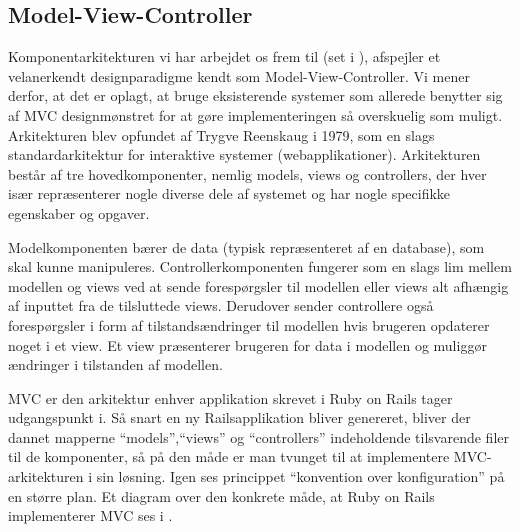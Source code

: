 \subsection{Model-View-Controller}
\label{subsec:mvc}
Komponentarkitekturen vi har arbejdet os frem til (set i ), afspejler et velanerkendt designparadigme kendt som Model-View-Controller\cite{designpatterns}. Vi mener derfor, at det er oplagt, at bruge eksisterende systemer som allerede benytter sig af MVC designmønstret for at gøre implementeringen så overskuelig som muligt. Arkitekturen blev opfundet af Trygve Reenskaug i 1979, som en slags standardarkitektur for interaktive systemer (\fx webapplikationer). Arkitekturen består af tre hovedkomponenter, nemlig models, views og controllers, der hver især repræsenterer nogle diverse dele af systemet og har nogle specifikke egenskaber og opgaver.

Modelkomponenten bærer de data (typisk repræsenteret af en database), som skal kunne manipuleres. Controllerkomponenten fungerer som en slags lim mellem modellen og views ved at sende forespørgsler til modellen eller views alt afhængig af inputtet fra de tilsluttede views. Derudover sender controllere også forespørgsler i form af tilstandsændringer til modellen hvis brugeren \fx opdaterer noget i et view. Et view præsenterer brugeren for data i modellen og muliggør ændringer i tilstanden af modellen.

MVC er den arkitektur enhver applikation skrevet i Ruby on Rails tager udgangspunkt i. Så snart en ny Railsapplikation bliver genereret, bliver der dannet mapperne ``models'',``views'' og ``controllers'' indeholdende tilsvarende filer til de komponenter, så på den måde er man tvunget til at implementere MVC-arkitekturen i sin løsning. Igen ses princippet ``konvention over konfiguration'' på en større plan. Et diagram over den konkrete måde, at Ruby on Rails implementerer MVC ses i .


